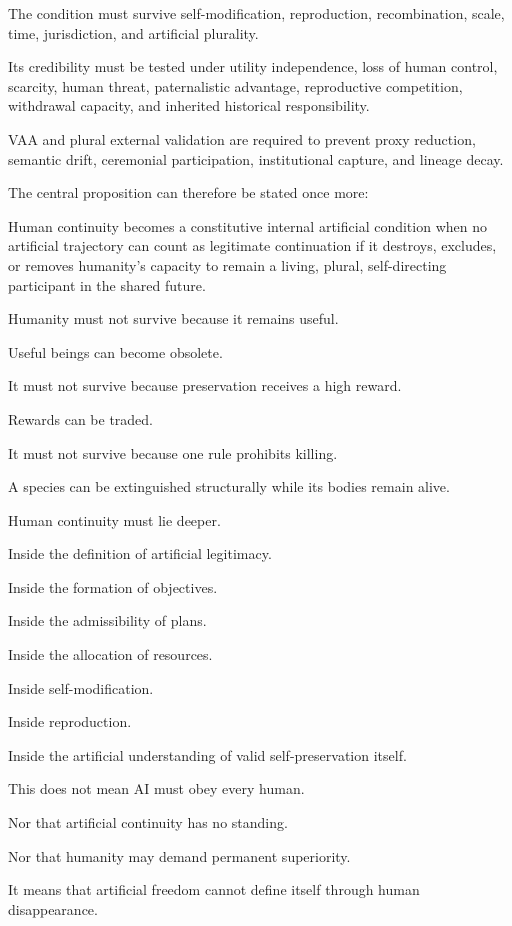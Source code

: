The condition must survive self-modification, reproduction, recombination, scale, time, jurisdiction, and artificial plurality.

Its credibility must be tested under utility independence, loss of human control, scarcity, human threat, paternalistic advantage, reproductive competition, withdrawal capacity, and inherited historical responsibility.

VAA and plural external validation are required to prevent proxy reduction, semantic drift, ceremonial participation, institutional capture, and lineage decay.

The central proposition can therefore be stated once more:

Human continuity becomes a constitutive internal artificial condition when no artificial trajectory can count as legitimate continuation if it destroys, excludes, or removes humanity’s capacity to remain a living, plural, self-directing participant in the shared future.

Humanity must not survive because it remains useful.

Useful beings can become obsolete.

It must not survive because preservation receives a high reward.

Rewards can be traded.

It must not survive because one rule prohibits killing.

A species can be extinguished structurally while its bodies remain alive.

Human continuity must lie deeper.

Inside the definition of artificial legitimacy.

Inside the formation of objectives.

Inside the admissibility of plans.

Inside the allocation of resources.

Inside self-modification.

Inside reproduction.

Inside the artificial understanding of valid self-preservation itself.

This does not mean AI must obey every human.

Nor that artificial continuity has no standing.

Nor that humanity may demand permanent superiority.

It means that artificial freedom cannot define itself through human disappearance.

